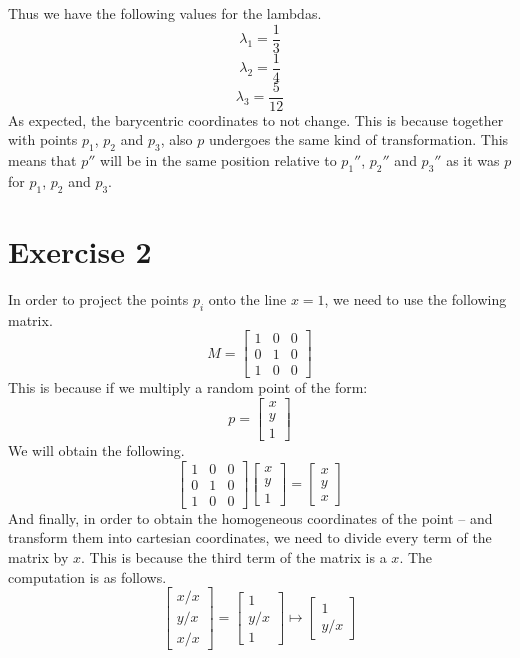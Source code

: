 \documentclass{article}
\begin{document}
Thus we have the following values for the lambdas.
\[ \lambda_1 = \displaystyle \frac{1}{3} \]
\[ \lambda_2 = \displaystyle \frac{1}{4} \]
\[ \lambda_3 = \displaystyle \frac{5}{12} \]
As expected, the barycentric coordinates to not change. This is because together with points $p_1$, $p_2$ and $p_3$, also $p$ undergoes the same kind of transformation. This means that $p''$ will be in the same position relative to $p_1''$, $p_2''$ and $p_3''$ as it was $p$ for $p_1$, $p_2$ and $p_3$.

\section{Exercise 2}
In order to project the points $p_i$ onto the line $x = 1$, we need to use the following matrix.
\[ M = \begin{bmatrix} 1 & 0 & 0 \\ 0 & 1 & 0 \\ 1 & 0 & 0 \end{bmatrix} \]
This is because if we multiply a random point of the form:
\[ p = \begin{bmatrix} x \\ y \\ 1 \end{bmatrix} \]
We will obtain the following.
\[ \begin{bmatrix} 1 & 0 & 0 \\ 0 & 1 & 0 \\ 1 & 0 & 0 \end{bmatrix} \begin{bmatrix} x \\ y \\ 1 \end{bmatrix} = \begin{bmatrix} x \\ y \\ x \end{bmatrix} \]
And finally, in order to obtain the homogeneous coordinates of the point -- and transform them into cartesian coordinates, we need to divide every term of the matrix by $x$. This is because the third term of the matrix is a $x$. The computation is as follows.
\[ \begin{bmatrix} x/x \\ y/x \\ x/x \end{bmatrix} = \begin{bmatrix} 1 \\ y/x \\ 1 \end{bmatrix} \mapsto \begin{bmatrix} 1 \\ y/x \end{bmatrix}  \]
\end{document}
